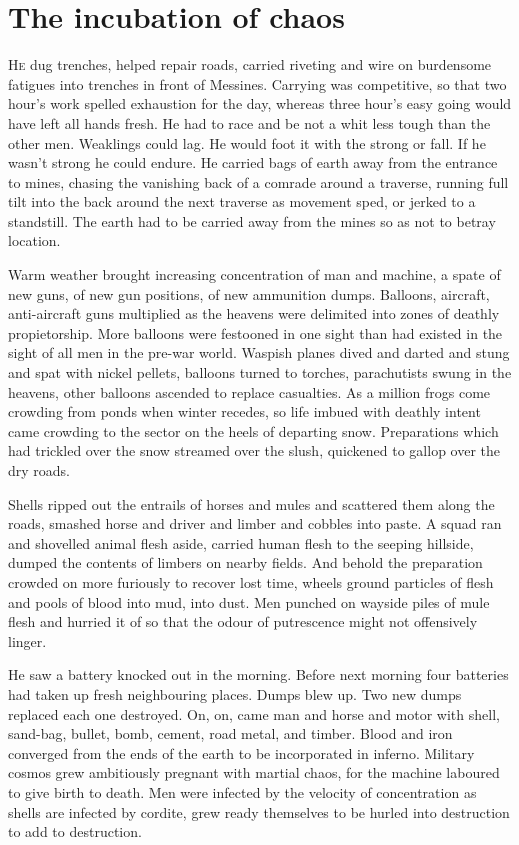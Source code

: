 \chapter*{\textsf{The incubation of chaos}}

H\textsc{e} dug trenches, helped repair roads, carried riveting and wire on burdensome fatigues into trenches in front of Messines. Carrying was competitive, so that two hour's work spelled exhaustion for the day, whereas three hour's easy going would have left all hands fresh. He had to race and be not a whit less tough than the other men. Weaklings could lag. He would foot it with the strong or fall. If he wasn't strong he could endure. He carried bags of earth away from the entrance to mines, chasing the vanishing back of a comrade around a traverse, running full tilt into the back around the next traverse as movement sped, or jerked to a standstill. The earth had to be carried away from the mines so as not to betray location.

Warm weather brought increasing concentration of man and machine, a spate of new guns, of new gun positions, of new ammunition dumps. Balloons, aircraft, anti-aircraft guns multiplied as the heavens were delimited into zones of deathly propietorship. More balloons were festooned in one sight than had existed in the sight of all men in the pre-war world. Waspish planes dived and darted and stung and spat with nickel pellets, balloons turned to torches, parachutists swung in the heavens, other balloons ascended to replace casualties. As a million frogs come crowding from ponds when winter recedes, so life imbued with deathly intent came crowding to the sector on the heels of departing snow. Preparations which had trickled over the snow streamed over the slush, quickened to gallop over the dry roads.

Shells ripped out the entrails of horses and mules and scattered them along the roads, smashed horse and driver and limber and cobbles into paste. A squad ran and shovelled animal flesh aside, carried human flesh to the seeping hillside, dumped the contents of limbers on nearby fields. And behold the preparation crowded on more furiously to recover lost time, wheels ground particles of flesh and pools of blood into mud, into dust. Men punched on wayside piles of mule flesh and hurried it of so that the odour of putrescence might not offensively linger.

He saw a battery knocked out in the morning. Before next morning four batteries had taken up fresh neighbouring places. Dumps blew up. Two new dumps replaced each one destroyed. On, on, came man and horse and motor with shell, sand-bag, bullet, bomb, cement, road metal, and timber. Blood and iron converged from the ends of the earth to be incorporated in inferno. Military cosmos grew ambitiously pregnant with martial chaos, for the machine laboured to give birth to death. Men were infected by the velocity of concentration as shells are infected by cordite, grew ready themselves to be hurled into destruction to add to destruction.

